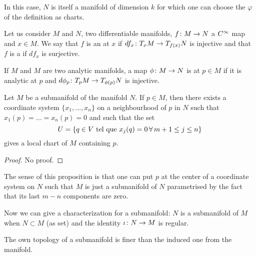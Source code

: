 In this case, $N$ is itself a manifold of dimension $k$ for which one can choose the $\varphi$ of the definition as charts.

Let us consider $M$ and $N$, two differentiable manifolds, $f\colon M\to N$ a $C^{\infty}$ map and $x\in M$. We say that $f$ is an  at $x$ if $df_x\colon T_xM\to T_{f(x)}N$ is injective and that $f$ is a  if $df_x$ is surjective.

If $M$ and $M$ are two analytic manifolds, a map $\phi\colon M\to N$ is \label{PgDefRegular} at $p\in M$ if it is analytic at $p$ and $d\phi_p\colon T_pM\to T_{\phi(p)}N$ is injective.

\begin{proposition}
Let $M$ be a submanifold of the manifold $N$. If $p\in M$, then there  exists a coordinate system $\{x_1,\ldots,x_n\}$ on a neighbourhood of $p$ in $N$ such that $x_1(p)=\ldots=x_n(p)=0$ and such that the set
\[
   U=\{q\in V\text{ tel que } x_j(q)=0\,\forall\, m+1\leq j\leq n\}
\]
gives a local chart of $M$ containing $p$.
\label{prop:var_coord}
\end{proposition}

\begin{proof}
No proof.
\end{proof}

The sense of this proposition is that one can put $p$ at the center of a coordinate system on $N$ such that $M$ is just a submanifold of $N$ parametrised by the fact that its last $m-n$ components are zero.

Now we can give a characterization for a submanifold: $N$ is a submanifold of $M$ when $N\subset M$ (as set) and the identity $\iota\colon N\to M$ is regular.\label{pg:caract_subvar}

\begin{proposition}
The own topology of a submanifold is finer than the induced one from the manifold.
\label{prop:topo_sub_manif}
\end{proposition}

